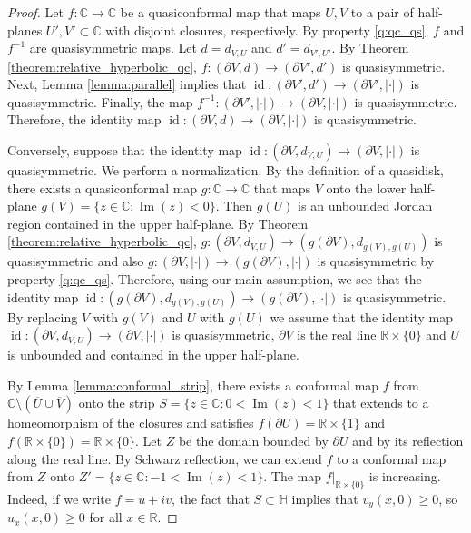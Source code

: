 \documentclass[letterpaper]{amsart}
\theoremstyle{plain}
\theoremstyle{definition}
\theoremstyle{remark}
\numberwithin{equation}{section}
\numberwithin{theorem}{section}
\renewcommand{\bar}{\overline}
\newcommand{\R}{\mathbb R}
\newcommand{\C}{\mathbb C}
\newcommand{\UHP}{\mathbb H}
\DeclareMathOperator{\id}{id}
\DeclareMathOperator{\im}{Im}
\begin{document}
\begin{proof}
Let $f\colon \C\to \C$ be a quasiconformal map that maps $U,V$ to a pair of half-planes $U',V'\subset \C$ with disjoint closures, respectively. By property \ref{q:qc_qs}, $f$ and $f^{-1}$ are quasisymmetric maps. Let $d=d_{V,U}$ and $d'=d_{V',U'}$. By Theorem \ref{theorem:relative_hyperbolic_qc}, $f\colon (\partial V,d)\to (\partial V',d')$ is quasisymmetric.  Next, Lemma \ref{lemma:parallel} implies that $\id\colon (\partial V',d')\to (\partial V',|\cdot|)$ is quasisymmetric. Finally, the map $f^{-1}\colon (\partial V',|\cdot|)\to (\partial V,|\cdot|)$ is quasisymmetric. Therefore, the identity map $\id \colon (\partial V,d)\to (\partial V,|\cdot|)$ is quasisymmetric.  

Conversely, suppose that the identity map $\id \colon (\partial V,d_{V,U})\to (\partial V,|\cdot|)$ is quasisymmetric. We perform a normalization. By the definition of a quasidisk, there exists a quasiconformal map  $g\colon \C\to \C$ that maps $V$ onto the lower half-plane $g(V)=\{z\in \C: \im(z)<0\}$. Then $g(U)$ is an unbounded Jordan region contained in the upper half-plane. By Theorem \ref{theorem:relative_hyperbolic_qc}, $g\colon (\partial V,d_{V,U})\to (g(\partial V),d_{g(V),g(U)})$ is quasisymmetric and also $g\colon (\partial V,|\cdot|)\to (g(\partial V),|\cdot|)$ is quasisymmetric by property \ref{q:qc_qs}. Therefore, using our main assumption, we see that the identity map $\id \colon (g(\partial V),d_{g(V),g(U)})\to (g(\partial V),|\cdot|)$ is quasisymmetric.  By replacing $V$ with $g(V)$ and $U$ with $g(U)$ we assume that the identity map $\id \colon (\partial V,d_{V,U})\to (\partial V,|\cdot|)$ is quasisymmetric, $\partial V$ is the real line $\R\times \{0\}$ and $U$ is unbounded and contained in the upper half-plane.

By Lemma \ref{lemma:conformal_strip}, there exists a conformal map $f$ from $\C\setminus (\bar U\cup \bar V)$ onto the strip $S=\{z\in \C: 0<\im(z)<1\}$  that extends to a homeomorphism of the closures and satisfies $f(\partial U)=\R\times\{1\}$ and $f(\R\times\{0\})=\R\times\{0\}$. Let $Z$ be the domain bounded by $\partial U$ and by its reflection along the real line. By Schwarz reflection, we can extend $f$ to a conformal map from $Z$ onto $Z'=\{z\in \C:-1<\im (z)<1\}$. The map $f|_{\R\times\{0\}}$ is increasing. Indeed, if we write $f=u+iv$, the fact that $S\subset \UHP$ implies that $v_y(x,0)\geq 0$, so $u_x(x,0)\geq 0$ for all $x\in \R$. 


\end{proof}
\end{document}
